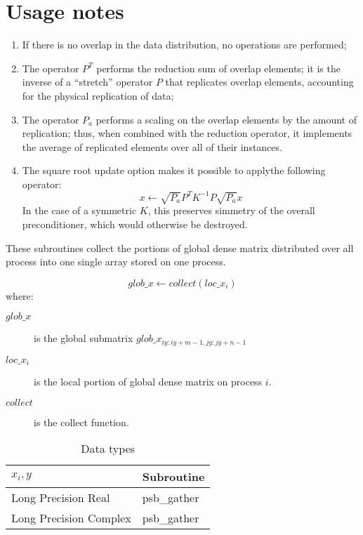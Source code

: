 \section*{Usage notes}
\begin{enumerate}
\item If there is no overlap in the data distribution, no operations
are performed;
\item The operator $P^{T}$ performs the reduction sum of overlap
elements; it is the inverse of a ``stretch'' operator $P$ that
replicates overlap elements, accounting for the physical replication
of data;
\item The operator $P_a$ performs a scaling on the overlap elements by
the amount of replication; thus, when combined with the reduction
operator, it implements the average of replicated elements over all of
their instances. 
\item The square root update option makes it possible to applythe
following operator: 
\[ x\leftarrow \sqrt{P_a} P^{T} K^{-1} P \sqrt{P_a} x\]
In the case of a symmetric $K$, this preserves simmetry of the overall
preconditioner, which would otherwise be destroyed. 
\end{enumerate}


%
%


These subroutines collect the portions of global dense matrix
distributed over all process into one single array stored on one
process.

\[ glob\_x \leftarrow collect(loc\_x_i) \]
where:
\begin{description}
\item[$glob\_x$] is the global submatrix $glob\_x_{iy:iy+m-1,jy:jy+n-1}$
\item[$loc\_x_i$] is the local portion of global dense matrix on
process $i$.
\item[$collect$] is the collect function.
\end{description}

\begin{table}[h]
\begin{center}
\begin{tabular}{ll}
\hline
$x_i, y$ & {\bf Subroutine}\\
\hline
Long Precision Real & psb\_gather \\
Long Precision Complex & psb\_gather \\
\hline
\end{tabular}
\end{center}
\caption{Data types\label{tab:gather}}
\end{table}

